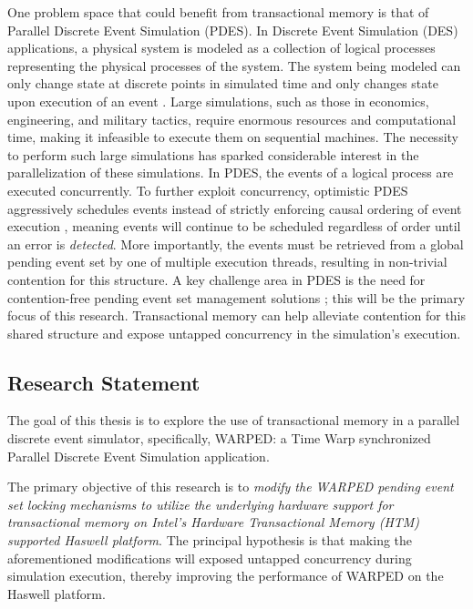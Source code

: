 \documentclass[a4paper]{article}
\begin{document}
\indent 
One problem space that could benefit from transactional memory is that of
Parallel Discrete Event Simulation (PDES).  In Discrete Event Simulation (DES)
applications, a physical system is modeled as a collection of logical processes
representing the physical processes of the system.  The system being modeled can
only change state at discrete points in simulated time and only changes state
upon execution of an event \cite{fujimoto}.  Large simulations, such as those in
economics, engineering, and military tactics, require enormous resources and
computational time, making it infeasible to execute them on sequential machines.
The necessity to perform such large simulations has sparked considerable
interest in the parallelization of these simulations.  In PDES, the events of a
logical process are executed concurrently.  To further exploit concurrency,
optimistic PDES aggressively schedules events instead of strictly enforcing
causal ordering of event execution \cite{fujimoto,dickman_thesis}, meaning
events will continue to be scheduled regardless of order until an error is
\textit{detected}.  More importantly, the events must be retrieved from a global
pending event set by one of multiple execution threads, resulting in non-trivial
contention for this structure.  A key challenge area in PDES is the need for
contention-free pending event set management solutions \cite{dickman}; this will
be the primary focus of this research. Transactional memory can help alleviate
contention for this shared structure and expose untapped concurrency in the
simulation's execution.
\par

\subsection{\textbf{Research Statement}}

\indent 
The goal of this thesis is to explore the use of transactional memory in
a parallel discrete event simulator, specifically, WARPED: a Time
Warp synchronized Parallel Discrete Event Simulation application.
\par

\indent
The primary objective of this research is to \textit{modify the WARPED pending event set
    locking mechanisms to utilize the underlying hardware support for
    transactional memory on Intel's Hardware Transactional Memory (HTM)
supported Haswell platform}.  The principal hypothesis is that making the
aforementioned modifications will exposed untapped concurrency 
during simulation execution, thereby improving the performance of WARPED on the
Haswell platform.
\par
\end{document}
